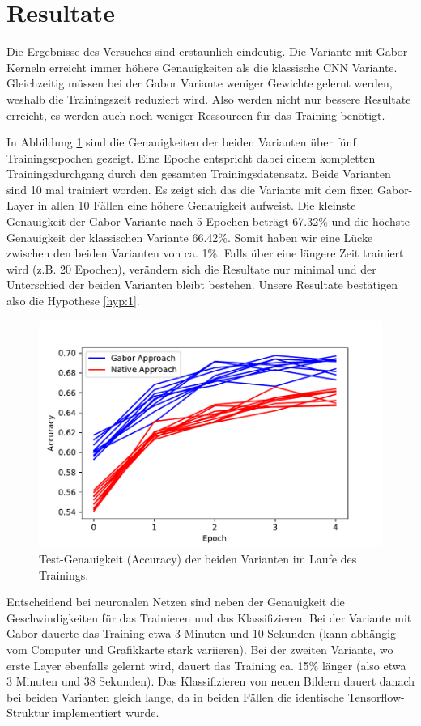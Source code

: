 \section{Resultate}

Die Ergebnisse des Versuches sind erstaunlich eindeutig.
Die Variante mit Gabor-Kerneln erreicht immer höhere Genauigkeiten als die klassische CNN Variante.
Gleichzeitig müssen bei der Gabor Variante weniger Gewichte gelernt werden, weshalb die Trainingszeit reduziert wird.
Also werden nicht nur bessere Resultate erreicht, es werden auch noch weniger Ressourcen für das Training benötigt.

In Abbildung \ref{fig:acc} sind die Genauigkeiten der beiden Varianten über fünf Trainingsepochen gezeigt.
Eine Epoche entspricht dabei einem kompletten Trainingsdurchgang durch den gesamten Trainingsdatensatz.
Beide Varianten sind 10 mal trainiert worden. 
Es zeigt sich das die Variante mit dem fixen Gabor-Layer in allen 10 Fällen eine höhere Genauigkeit aufweist.
Die kleinste Genauigkeit der Gabor-Variante nach 5 Epochen beträgt 67.32\% und die höchste Genauigkeit der klassischen Variante 66.42\%.
Somit haben wir eine Lücke zwischen den beiden Varianten von ca. 1\%.
Falls über eine längere Zeit trainiert wird (z.B. 20 Epochen), verändern sich die Resultate nur minimal und der Unterschied der beiden Varianten bleibt bestehen.
Unsere Resultate bestätigen also die Hypothese \ref{hyp:1}.

\begin{figure}
	\centering
	\includegraphics[width=0.7\linewidth]{./papers/visuell/images/accuracy}
	\caption{Test-Genauigkeit (Accuracy) der beiden Varianten im Laufe des Trainings.}
	\label{fig:acc}
\end{figure}

Entscheidend bei neuronalen Netzen sind neben der Genauigkeit die Geschwindigkeiten für das Trainieren und das Klassifizieren.
Bei der Variante mit Gabor dauerte das Training etwa 3 Minuten und 10 Sekunden (kann abhängig vom Computer und Grafikkarte stark variieren).
Bei der zweiten Variante, wo erste Layer ebenfalls gelernt wird, dauert das Training ca. 15\% länger (also etwa 3 Minuten und 38 Sekunden).
Das Klassifizieren von neuen Bildern dauert danach bei beiden Varianten gleich lange, da in beiden Fällen die identische Tensorflow-Struktur implementiert wurde.

